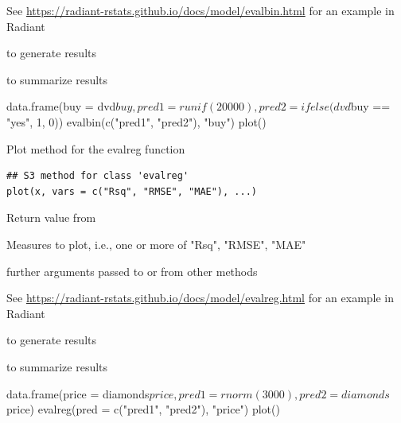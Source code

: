\documentclass[a4paper]{book}
\begin{document}
%
\begin{Details}
See \url{https://radiant-rstats.github.io/docs/model/evalbin.html} for an example in Radiant
\end{Details}
%
\begin{SeeAlso}
 to generate results

 to summarize results
\end{SeeAlso}
%
\begin{Examples}
\begin{ExampleCode}
data.frame(buy = dvd$buy, pred1 = runif(20000), pred2 = ifelse(dvd$buy == "yes", 1, 0)) %
  evalbin(c("pred1", "pred2"), "buy") %
  plot()
\end{ExampleCode}
\end{Examples}
%
\begin{Description}
Plot method for the evalreg function
\end{Description}
%
\begin{Usage}
\begin{verbatim}
## S3 method for class 'evalreg'
plot(x, vars = c("Rsq", "RMSE", "MAE"), ...)
\end{verbatim}
\end{Usage}
%
\begin{Arguments}
\begin{ldescription}
\item[\code{x}] Return value from 

\item[\code{vars}] Measures to plot, i.e., one or more of "Rsq", "RMSE", "MAE"

\item[\code{...}] further arguments passed to or from other methods
\end{ldescription}
\end{Arguments}
%
\begin{Details}
See \url{https://radiant-rstats.github.io/docs/model/evalreg.html} for an example in Radiant
\end{Details}
%
\begin{SeeAlso}
 to generate results

 to summarize results
\end{SeeAlso}
%
\begin{Examples}
\begin{ExampleCode}
data.frame(price = diamonds$price, pred1 = rnorm(3000), pred2 = diamonds$price) %
  evalreg(pred = c("pred1", "pred2"), "price") %
  plot()

\end{ExampleCode}
\end{Examples}
\end{document}
